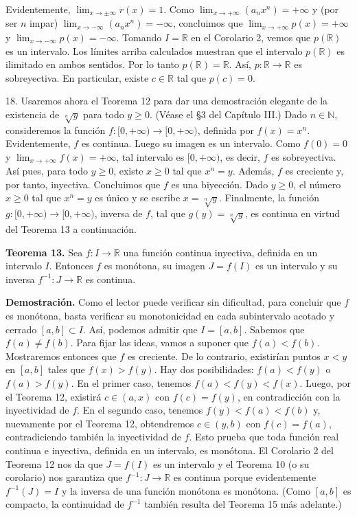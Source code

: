 \documentclass[12pt,oneside]{book}
\begin{document}
Evidentemente, \(\lim_{x \to \pm \infty} r(x) = 1\). Como \(\lim_{x \to +\infty} (a_n x^n) = +\infty\) y (por ser \(n\) impar) \(\lim_{x \to -\infty} (a_n x^n) = -\infty\), concluimos que \(\lim_{x \to +\infty} p(x) = +\infty\) y \(\lim_{x \to -\infty} p(x) = -\infty\). Tomando \(I = \mathbb{R}\) en el Corolario 2, vemos que \(p(\mathbb{R})\) es un intervalo. Los límites arriba calculados muestran que el intervalo \(p(\mathbb{R})\) es ilimitado en ambos sentidos. Por lo tanto \(p(\mathbb{R}) = \mathbb{R}\). Así, \(p: \mathbb{R} \to \mathbb{R}\) es sobreyectiva. En particular, existe \(c \in \mathbb{R}\) tal que \(p(c) = 0\).

18. Usaremos ahora el Teorema 12 para dar una demostración elegante de la existencia de \(\sqrt[n]{y}\) para todo \(y \geq 0\). (Véase el §3 del Capítulo III.) Dado \(n \in \mathbb{N}\), consideremos la función \(f: [0, +\infty) \to [0, +\infty)\), definida por \(f(x) = x^n\). Evidentemente, \(f\) es continua. Luego su imagen es un intervalo. Como \(f(0) = 0\) y \(\lim_{x \to +\infty} f(x) = +\infty\), tal intervalo es \([0, +\infty)\), es decir, \(f\) es sobreyectiva. Así pues, para todo \(y \geq 0\), existe \(x \geq 0\) tal que \(x^n = y\). Además, \(f\) es creciente y, por tanto, inyectiva. Concluimos que \(f\) es una biyección. Dado \(y \geq 0\), el número \(x \geq 0\) tal que \(x^n = y\) es único y se escribe \(x = \sqrt[n]{y}\). Finalmente, la función \(g: [0, +\infty) \to [0, +\infty)\), inversa de \(f\), tal que \(g(y) = \sqrt[n]{y}\), es continua en virtud del Teorema 13 a continuación.

\textbf{Teorema 13.} Sea \(f: I \to \mathbb{R}\) una función continua inyectiva, definida en un intervalo \(I\). Entonces \(f\) es monótona, su imagen \(J = f(I)\) es un intervalo y su inversa \(f^{-1}: J \to \mathbb{R}\) es continua.

\textbf{Demostración.} Como el lector puede verificar sin dificultad, para concluir que \(f\) es monótona, basta verificar su monotonicidad en cada subintervalo acotado y cerrado \([a, b] \subset I\). Así, podemos admitir que \(I = [a, b]\). Sabemos que \(f(a) \neq f(b)\). Para fijar las ideas, vamos a suponer que \(f(a) < f(b)\). Mostraremos entonces que \(f\) es creciente. De lo contrario, existirían puntos \(x < y\) en \([a, b]\) tales que \(f(x) > f(y)\). Hay dos posibilidades: \(f(a) < f(y)\) o \(f(a) > f(y)\). En el primer caso, tenemos \(f(a) < f(y) < f(x)\). Luego, por el Teorema 12, existirá \(c \in (a, x)\) con \(f(c) = f(y)\), en contradicción con la inyectividad de \(f\). En el segundo caso, tenemos \(f(y) < f(a) < f(b)\) y, nuevamente por el Teorema 12, obtendremos \(c \in (y, b)\) con \(f(c) = f(a)\), contradiciendo también la inyectividad de \(f\). Esto prueba que toda función real continua e inyectiva, definida en un intervalo, es monótona. El Corolario 2 del Teorema 12 nos da que \(J = f(I)\) es un intervalo y el Teorema 10 (o su corolario) nos garantiza que \(f^{-1}: J \to \mathbb{R}\) es continua porque evidentemente \(f^{-1}(J) = I\) y la inversa de una función monótona es monótona. (Como \([a, b]\) es compacto, la continuidad de \(f^{-1}\) también resulta del Teorema 15 más adelante.)
\end{document}
